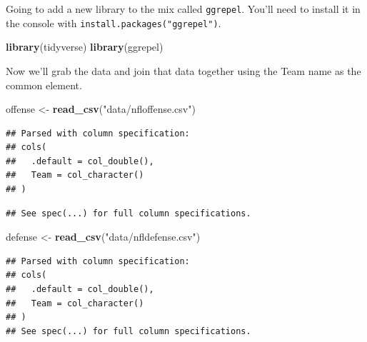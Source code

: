 \documentclass[
]{book}
\newenvironment{Shaded}{\begin{snugshade}}{\end{snugshade}}
\newcommand{\DataTypeTok}[1]{\textcolor[rgb]{0.13,0.29,0.53}{#1}}
\newcommand{\KeywordTok}[1]{\textcolor[rgb]{0.13,0.29,0.53}{\textbf{#1}}}
\newcommand{\NormalTok}[1]{#1}
\newcommand{\OperatorTok}[1]{\textcolor[rgb]{0.81,0.36,0.00}{\textbf{#1}}}
\newcommand{\StringTok}[1]{\textcolor[rgb]{0.31,0.60,0.02}{#1}}
\begin{document}
Going to add a new library to the mix called \texttt{ggrepel}. You'll need to install it in the console with \texttt{install.packages("ggrepel")}.

\begin{Shaded}
\begin{Highlighting}[]
\KeywordTok{library}\NormalTok{(tidyverse)}
\KeywordTok{library}\NormalTok{(ggrepel)}
\end{Highlighting}
\end{Shaded}

Now we'll grab the data and join that data together using the Team name as the common element.

\begin{Shaded}
\begin{Highlighting}[]
\NormalTok{offense <-}\StringTok{ }\KeywordTok{read_csv}\NormalTok{(}\StringTok{"data/nfloffense.csv"}\NormalTok{)}
\end{Highlighting}
\end{Shaded}

\begin{verbatim}
## Parsed with column specification:
## cols(
##   .default = col_double(),
##   Team = col_character()
## )
\end{verbatim}

\begin{verbatim}
## See spec(...) for full column specifications.
\end{verbatim}

\begin{Shaded}
\begin{Highlighting}[]
\NormalTok{defense <-}\StringTok{ }\KeywordTok{read_csv}\NormalTok{(}\StringTok{"data/nfldefense.csv"}\NormalTok{)}
\end{Highlighting}
\end{Shaded}

\begin{verbatim}
## Parsed with column specification:
## cols(
##   .default = col_double(),
##   Team = col_character()
## )
## See spec(...) for full column specifications.
\end{verbatim}

\begin{Shaded}
\end{Shaded}
\end{document}
